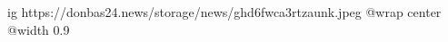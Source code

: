 
 
 
 
 

\ifcmt
  ig https://donbas24.news/storage/news/ghd6fwca3rtzaunk.jpeg
  @wrap center
  @width 0.9
\fi
